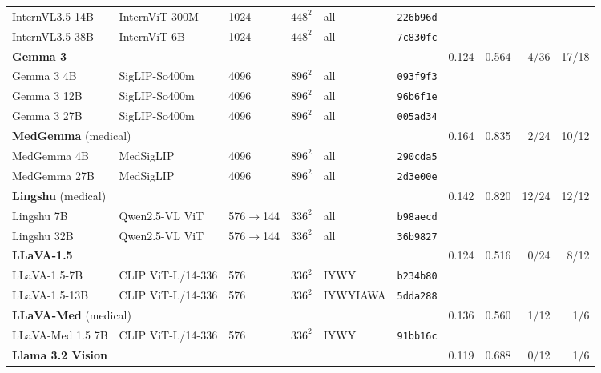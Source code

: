 \begin{table}[htbp]
{\begin{tabular}{llllll@{\hspace{8pt}}rrrr}
\quad InternVL3.5-14B & InternViT-300M & 1024 & $448^2$ & all & \texttt{226b96d} & & & & \\
\quad InternVL3.5-38B & InternViT-6B & 1024 & $448^2$ & all & \texttt{7c830fc} & & & & \\
\midrule
\multicolumn{6}{l}{\textbf{Gemma 3}~\citep{gemma2025gemma3}} & 0.124 & 0.564 & \cellcolor{cfTerra2}4/36 & \cellcolor{cfTerra4}17/18 \\
\quad Gemma 3 4B & SigLIP-So400m & 4096 & $896^2$ & all & \texttt{093f9f3} & & & & \\
\quad Gemma 3 12B & SigLIP-So400m & 4096 & $896^2$ & all & \texttt{96b6f1e} & & & & \\
\quad Gemma 3 27B & SigLIP-So400m & 4096 & $896^2$ & all & \texttt{005ad34} & & & & \\
\midrule
\multicolumn{6}{l}{\textbf{MedGemma} (medical)~\citep{sellergren2025medgemma}} & 0.164 & 0.835 & \cellcolor{cfTerra2}2/24 & \cellcolor{cfTerra3}10/12 \\
\quad MedGemma 4B & MedSigLIP & 4096 & $896^2$ & all & \texttt{290cda5} & & & & \\
\quad MedGemma 27B & MedSigLIP & 4096 & $896^2$ & all & \texttt{2d3e00e} & & & & \\
\midrule
\multicolumn{6}{l}{\textbf{Lingshu} (medical)~\citep{lasa2025lingshu}} & 0.142 & 0.820 & \cellcolor{cfTerra4}12/24 & \cellcolor{cfTerra4}12/12 \\
\quad Lingshu 7B & Qwen2.5-VL ViT & 576$\to$144 & $336^2$ & all & \texttt{b98aecd} & & & & \\
\quad Lingshu 32B & Qwen2.5-VL ViT & 576$\to$144 & $336^2$ & all & \texttt{36b9827} & & & & \\
\midrule
\multicolumn{6}{l}{\textbf{LLaVA-1.5}~\citep{liu2024improved}} & 0.124 & 0.516 & \cellcolor{cfTerra1}0/24 & \cellcolor{cfTerra3}8/12 \\
\quad LLaVA-1.5-7B & CLIP ViT-L/14-336 & 576 & $336^2$ & IYWY & \texttt{b234b80} & & & & \\
\quad LLaVA-1.5-13B & CLIP ViT-L/14-336 & 576 & $336^2$ & IYWYIAWA & \texttt{5dda288} & & & & \\
\midrule
\multicolumn{6}{l}{\textbf{LLaVA-Med} (medical)~\citep{li2023llavamed}} & 0.136 & 0.560 & \cellcolor{cfTerra2}1/12 & \cellcolor{cfTerra2}1/6 \\
\quad LLaVA-Med 1.5 7B & CLIP ViT-L/14-336 & 576 & $336^2$ & IYWY & \texttt{91bb16c} & & & & \\
\midrule
\multicolumn{6}{l}{\textbf{Llama 3.2 Vision}~\citep{meta2024llama32vision}} & 0.119 & 0.688 & \cellcolor{cfTerra1}0/12 & \cellcolor{cfTerra2}1/6 \\

\end{tabular}}
\end{table}
